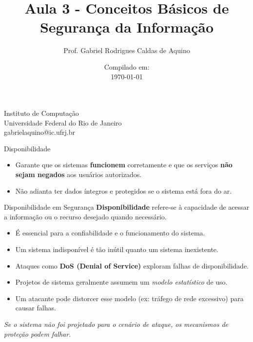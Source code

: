 \title{Aula 3 - Conceitos Básicos de Segurança da Informação}

\author{Prof. Gabriel Rodrigues Caldas de Aquino}

\institute
{
    Instituto de Computação \\
    Universidade Federal do Rio de Janeiro\\
    gabrielaquino@ic.ufrj.br %
}
\date{Compilado em: \\ \today} %



\begin{frame}
    \titlepage
\end{frame}




\begin{frame}{Disponibilidade}
\begin{itemize}
\item  Garante que os sistemas \textbf{funcionem} corretamente e que os serviços \textbf{não sejam negados} aos usuários autorizados.


    \item Não adianta ter dados íntegros e protegidos se o sistema está fora do ar.
\end{itemize}


   
\end{frame}



\begin{frame}{Disponibilidade em Segurança}
    \textbf{Disponibilidade} refere-se à capacidade de acessar a informação ou o recurso desejado quando necessário.

    \vspace{0.5cm}
    \begin{itemize}
        \item É essencial para a confiabilidade e o funcionamento do sistema.
        \item Um sistema indisponível é tão inútil quanto um sistema inexistente.
        \item Ataques como \textbf{DoS (Denial of Service)} exploram falhas de disponibilidade.
        \item Projetos de sistema geralmente assumem um \textit{modelo estatístico} de uso.
        \item Um atacante pode distorcer esse modelo (ex: tráfego de rede excessivo) para causar falhas.
    \end{itemize}

    \vspace{0.5cm}
    \textit{Se o sistema não foi projetado para o cenário de ataque, os mecanismos de proteção podem falhar.}
\end{frame}

